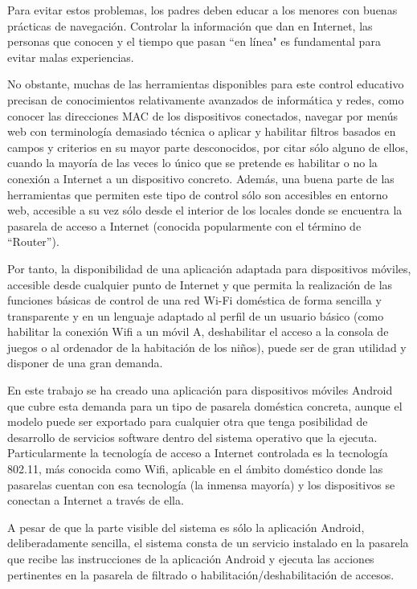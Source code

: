 \documentclass[12pt, twoside]{article}
\begin{document}
Para evitar estos problemas, los padres deben educar a los menores con buenas prácticas de navegación. Controlar la información que dan en Internet, las personas que conocen y el tiempo que pasan ``en línea" es fundamental para evitar malas experiencias.

No obstante, muchas de las herramientas disponibles para este control educativo precisan de conocimientos relativamente avanzados de informática y redes, como conocer las direcciones MAC de los dispositivos conectados, navegar por menús web con terminología demasiado técnica o aplicar y habilitar filtros basados en campos y criterios en su mayor parte desconocidos, por citar sólo alguno de ellos, cuando la mayoría de las veces lo único que se pretende es habilitar o no la conexión a Internet a un dispositivo concreto. Además, una buena parte de las herramientas que permiten este tipo de control sólo son accesibles en entorno web, accesible a su vez sólo desde el interior de los locales donde se encuentra la pasarela de acceso a Internet (conocida popularmente con el término de ``Router'').

Por tanto, la disponibilidad de una aplicación adaptada para dispositivos móviles, accesible desde cualquier punto de Internet y que permita la realización de las funciones básicas de control de una red Wi-Fi doméstica de forma sencilla y transparente y en un lenguaje adaptado al perfil de un usuario básico (como habilitar la conexión Wifi a un móvil A, deshabilitar el acceso a la consola de juegos o al ordenador de la habitación de los niños), puede ser de gran utilidad y disponer de una gran demanda.

En este trabajo se ha creado una aplicación para dispositivos móviles Android que cubre esta demanda para un tipo de pasarela doméstica concreta, aunque el modelo puede ser exportado para cualquier otra que tenga posibilidad de desarrollo de servicios software dentro del sistema operativo que la ejecuta. Particularmente la tecnología de acceso a Internet controlada es la tecnología 802.11, más conocida como Wifi, aplicable en el ámbito doméstico donde las pasarelas cuentan con esa tecnología (la inmensa mayoría) y los dispositivos se conectan a Internet a través de ella.

A pesar de que la parte visible del sistema es sólo la aplicación Android, deliberadamente sencilla, el sistema consta de un servicio instalado en la pasarela que recibe las instrucciones de la aplicación Android y ejecuta las acciones pertinentes en la pasarela de filtrado o habilitación/deshabilitación de accesos.
\end{document}
